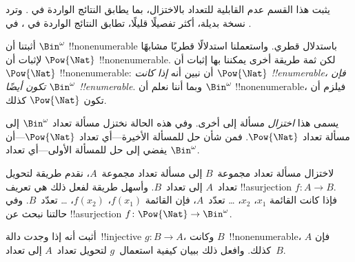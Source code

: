 \documentclass[../../../include/open-logic-section]{subfiles}
\begin{document}


\begin{editorial}
  يثبت هذا القسم عدم القابلية للتعداد بالاختزال، بما يطابق النتائج
  الواردة في . وترد نسخة بديلة، أكثر تفصيلًا
  قليلًا، تطابق النتائج الواردة في ، في
  .
\end{editorial}

أثبتنا أن $\Bin^\omega$ !!{nonenumerable} باستدلال قطري.
واستعملنا استدلالًا قطريًا مشابهًا لإثبات أن
$\Pow{\Nat}$ !!{nonenumerable}. لكن ثمة طريقة أخرى يمكننا بها إثبات
أن $\Pow{\Nat}$ !!{nonenumerable}: أن نبين أنه \emph{إذا كانت
$\Pow{\Nat}$ !!{enumerable}، فإن $\Bin^\omega$ تكون أيضًا
!!{enumerable}}. وبما أننا نعلم أن $\Bin^\omega$ !!{nonenumerable}،
فيلزم أن تكون $\Pow{\Nat}$ كذلك.

يسمى هذا \emph{اختزال} مسألة إلى أخرى. وفي هذه الحالة نختزل مسألة
تعداد $\Bin^\omega$ إلى مسألة تعداد $\Pow{\Nat}$. فمن شأن حل للمسألة
الأخيرة---أي تعداد $\Pow{\Nat}$---أن يفضي إلى حل للمسألة
الأولى---أي تعداد $\Bin^\omega$.

لاختزال مسألة تعداد مجموعة~$B$ إلى مسألة تعداد مجموعة~$A$، نقدم
طريقة لتحويل تعداد~$A$ إلى تعداد~$B$. وأسهل طريقة لفعل ذلك هي تعريف
!!a{surjection} $f\colon A \to B$. فإذا كانت القائمة $x_1$، $x_2$،
\dots{} تعدّد~$A$، فإن القائمة $f(x_1)$، $f(x_2)$، \dots{} تعدّد~$B$.
وفي حالتنا نبحث عن !!a{surjection} $f\colon \Pow{\Nat}
\to \Bin^\omega$.

\begin{prob}
أثبت أنه إذا وجدت دالة~!!{injective} $g\colon B \to A$، وكانت
$B$~!!{nonenumerable}، فإن $A$ كذلك. وافعل ذلك ببيان كيفية استعمال~$g$
لتحويل تعداد~$A$ إلى تعداد~$B$.
\end{prob}
\end{document}
